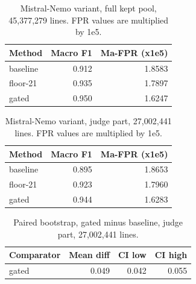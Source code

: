 \begin{table}[htbp]
\centering
\small
\begin{tabular}{lrr}
\toprule
\textbf{Method} & \textbf{Macro F1} & \textbf{Ma-FPR (x1e5)} \\
\midrule
baseline & 0.912 & 1.8583 \\
floor-21 & 0.935 & 1.7897 \\
gated & 0.950 & 1.6247 \\
\bottomrule
\end{tabular}
\caption{Mistral-Nemo variant, full kept pool, 45,377,279 lines. FPR values are multiplied by 1e5.}
\label{tab:mistralnemo_eval_fullpool}
\end{table}

\begin{table}[htbp]
\centering
\small
\begin{tabular}{lrr}
\toprule
\textbf{Method} & \textbf{Macro F1} & \textbf{Ma-FPR (x1e5)} \\
\midrule
baseline & 0.895 & 1.8653 \\
floor-21 & 0.923 & 1.7960 \\
gated & 0.944 & 1.6283 \\
\bottomrule
\end{tabular}
\caption{Mistral-Nemo variant, judge part, 27,002,441 lines. FPR values are multiplied by 1e5.}
\label{tab:mistralnemo_eval_judge}
\end{table}

\begin{table}[htbp]
\centering
\small
\begin{tabular}{lrrr}
\toprule
\textbf{Comparator} & \textbf{Mean diff} & \textbf{CI low} & \textbf{CI high} \\
\midrule
gated & 0.049 & 0.042 & 0.055 \\
\bottomrule
\end{tabular}
\caption{Paired bootstrap, gated minus baseline, judge part, 27,002,441 lines.}
\label{tab:mistralnemo_eval_bootstrap}
\end{table}
